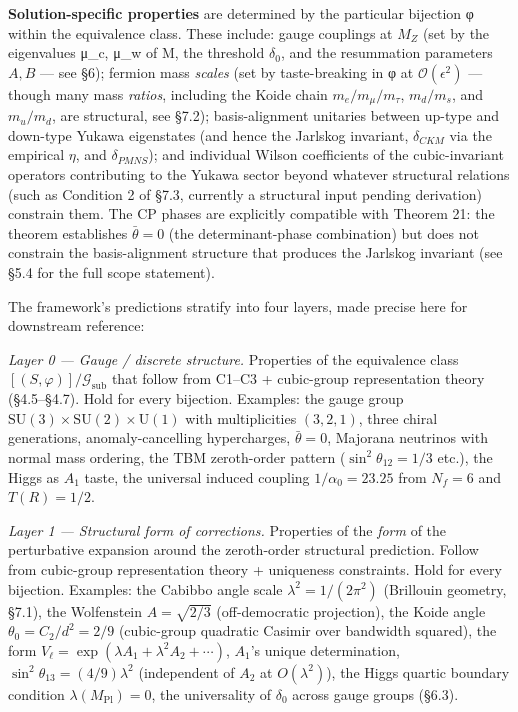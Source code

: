\documentclass[
]{article}
\begin{document}
\textbf{Solution-specific properties} are determined by the particular
bijection φ within the equivalence class. These include: gauge couplings
at \(M_Z\) (set by the eigenvalues μ\_c, μ\_w of M, the threshold
\(\delta_0\), and the resummation parameters \(A, B\) --- see §6);
fermion mass \emph{scales} (set by taste-breaking in φ at
\(\mathcal{O}(\epsilon^2)\) --- though many mass \emph{ratios},
including the Koide chain \(m_e/m_\mu/m_\tau\), \(m_d/m_s\), and
\(m_u/m_d\), are structural, see §7.2); basis-alignment unitaries
between up-type and down-type Yukawa eigenstates (and hence the Jarlskog
invariant, \(\delta_{CKM}\) via the empirical \(\eta\), and
\(\delta_{PMNS}\)); and individual Wilson coefficients of the
cubic-invariant operators contributing to the Yukawa sector beyond
whatever structural relations (such as Condition 2 of §7.3, currently a
structural input pending derivation) constrain them. The CP phases are
explicitly compatible with Theorem 21: the theorem establishes
\(\bar\theta = 0\) (the determinant-phase combination) but does not
constrain the basis-alignment structure that produces the Jarlskog
invariant (see §5.4 for the full scope statement).

The framework's predictions stratify into four layers, made precise here
for downstream reference:

\emph{Layer 0 --- Gauge / discrete structure.} Properties of the
equivalence class \([(S, \varphi)]/\mathcal{G}_{\text{sub}}\) that
follow from C1--C3 + cubic-group representation theory (§4.5--§4.7).
Hold for every bijection. Examples: the gauge group
\(\mathrm{SU}(3) \times \mathrm{SU}(2) \times \mathrm{U}(1)\) with
multiplicities \((3, 2, 1)\), three chiral generations,
anomaly-cancelling hypercharges, \(\bar\theta = 0\), Majorana neutrinos
with normal mass ordering, the TBM zeroth-order pattern
(\(\sin^2\theta_{12} = 1/3\) etc.), the Higgs as \(A_1\) taste, the
universal induced coupling \(1/\alpha_0 = 23.25\) from \(N_f = 6\) and
\(T(R) = 1/2\).

\emph{Layer 1 --- Structural form of corrections.} Properties of the
\emph{form} of the perturbative expansion around the zeroth-order
structural prediction. Follow from cubic-group representation theory +
uniqueness constraints. Hold for every bijection. Examples: the Cabibbo
angle scale \(\lambda^2 = 1/(2\pi^2)\) (Brillouin geometry, §7.1), the
Wolfenstein \(A = \sqrt{2/3}\) (off-democratic projection), the Koide
angle \(\theta_0 = C_2/d^2 = 2/9\) (cubic-group quadratic Casimir over
bandwidth squared), the form
\(V_\ell = \exp(\lambda A_1 + \lambda^2 A_2 + \cdots)\), \(A_1\)'s
unique determination, \(\sin^2\theta_{13} = (4/9)\lambda^2\)
(independent of \(A_2\) at \(O(\lambda^2)\)), the Higgs quartic boundary
condition \(\lambda(M_{\text{Pl}}) = 0\), the universality of
\(\delta_0\) across gauge groups (§6.3).
\end{document}
